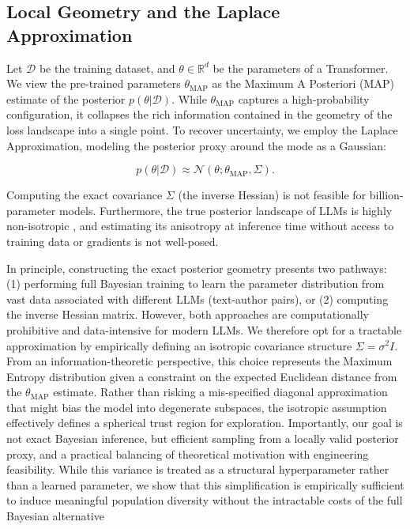 \documentclass[11pt]{article}
\begin{document}
\subsection{Local Geometry and the Laplace Approximation}

Let $\mathcal{D}$ be the training dataset, and $\theta \in \mathbb{R}^d$ be the parameters of a Transformer. We view the pre-trained parameters $\theta_{\text{MAP}}$ as the Maximum A Posteriori (MAP) estimate of the posterior $p(\theta|\mathcal{D})$. While $\theta_{\text{MAP}}$ captures a high-probability configuration, it collapses the rich information contained in the geometry of the loss landscape into a single point. To recover uncertainty, we employ the Laplace Approximation, modeling the posterior proxy around the mode as a Gaussian:

\begin{equation}
    p(\theta|\mathcal{D}) \approx \mathcal{N}(\theta; \theta_{\text{MAP}}, \Sigma).
\end{equation}

Computing the exact covariance $\Sigma$ (the inverse Hessian) is not feasible for billion-parameter models. Furthermore, the true posterior landscape of LLMs is highly non-isotropic \citep{li2018visualizing}, and estimating its anisotropy at inference time without access to training data or gradients is not well-posed.

In principle, constructing the exact posterior geometry presents two pathways: (1) performing full Bayesian training to learn the parameter distribution from vast data associated with different LLMs (text-author pairs), or (2) computing the inverse Hessian matrix.
However, both approaches are computationally prohibitive and data-intensive for modern LLMs. 
We therefore opt for a tractable approximation by empirically defining an isotropic covariance structure $\Sigma = \sigma^2 I$. 
From an information-theoretic perspective, this choice represents the Maximum Entropy distribution given a constraint on the expected Euclidean distance from the $\theta_{\text{MAP}}$ estimate. 
Rather than risking a mis-specified diagonal approximation that might bias the model into degenerate subspaces, the isotropic assumption effectively defines a spherical trust region for exploration. 
Importantly, our goal is not exact Bayesian inference, but efficient sampling from a locally valid posterior proxy, and a practical balancing of theoretical motivation with engineering feasibility.
While this variance is treated as a structural hyperparameter rather than a learned parameter, we show that this simplification is empirically sufficient to induce meaningful population diversity without the intractable costs of the full Bayesian alternative
\end{document}
